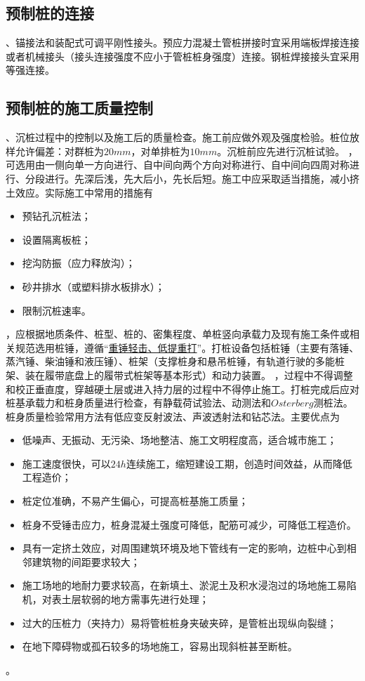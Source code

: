 \documentclass{book}
\begin{document}
\subsection{预制桩的连接}
、锚接法和装配式可调平刚性接头。预应力混凝土管桩拼接时宜采用端板焊接连接或者机械接头（接头连接强度不应小于管桩桩身强度）连接。钢桩焊接接头宜采用等强连接。
\subsection{预制桩的施工质量控制}
、沉桩过程中的控制以及施工后的质量检查。施工前应做外观及强度检验。桩位放样允许偏差：对群桩为$20mm$，对单排桩为$10mm$。沉桩前应先进行沉桩试验。
，可选用由一侧向单一方向进行、自中间向两个方向对称进行、自中间向四周对称进行、分段进行。先深后浅，先大后小，先长后短。施工中应采取适当措施，减小挤土效应。实际施工中常用的措施有
\begin{itemize}
    \item 预钻孔沉桩法；
    \item 设置隔离板桩；
    \item 挖沟防振（应力释放沟）；
    \item 砂井排水（或塑料排水板排水）；
    \item 限制沉桩速率。
\end{itemize}
，应根据地质条件、桩型、桩的、密集程度、单桩竖向承载力及现有施工条件或相关规范选用桩锤，遵循“\underline{重锤轻击、低提重打}”。打桩设备包括桩锤（主要有落锤、蒸汽锤、柴油锤和液压锤）、桩架（支撑桩身和悬吊桩锤，有轨道行驶的多能桩架、装在履带底盘上的履带式桩架等基本形式）和动力装置。
，过程中不得调整和校正垂直度，穿越硬土层或进入持力层的过程中不得停止施工。打桩完成后应对桩基承载力和桩身质量进行检查，有静载荷试验法、动测法和$Osterberg$测桩法。桩身质量检验常用方法有低应变反射波法、声波透射法和钻芯法。主要优点为\begin{itemize}
    \item 低噪声、无振动、无污染、场地整洁、施工文明程度高，适合城市施工；
    \item 施工速度很快，可以$24h$连续施工，缩短建设工期，创造时间效益，从而降低工程造价；
    \item 桩定位准确，不易产生偏心，可提高桩基施工质量；
    \item 桩身不受锤击应力，桩身混凝土强度可降低，配筋可减少，可降低工程造价。
\end{itemize}
\begin{itemize}
    \item 具有一定挤土效应，对周围建筑环境及地下管线有一定的影响，边桩中心到相邻建筑物的间距要求较大；
    \item 施工场地的地耐力要求较高，在新填土、淤泥土及积水浸泡过的场地施工易陷机，对表土层软弱的地方需事先进行处理；
    \item 过大的压桩力（夹持力）易将管桩桩身夹破夹碎，是管桩出现纵向裂缝；
    \item 在地下障碍物或孤石较多的场地施工，容易出现斜桩甚至断桩。
\end{itemize}
。
\end{document}
